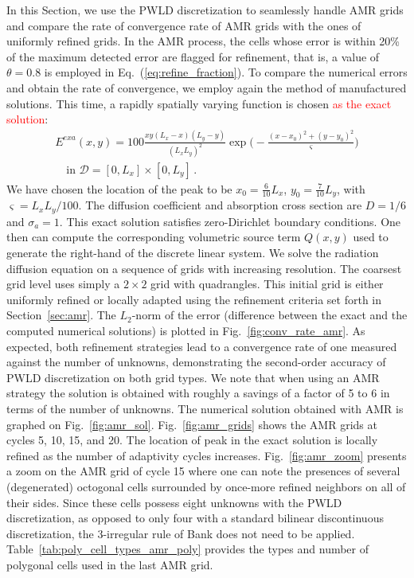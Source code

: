 \documentclass[preprint,10pt]{elsarticle}
\newcommand{\D}{\mathcal{D}}
\newcommand{\eqt}[1]{Eq.~(\ref{#1})}                     %
\newcommand{\fig}[1]{Fig.~\ref{#1}}                      %
\newcommand{\tbl}[1]{Table~\ref{#1}}                     %
\newcommand{\sct}[1]{Section~\ref{#1}}                   %
\newcommand{\tcr}[1]{\textcolor{red}{#1}}
\begin{document}
In this Section, we use the PWLD discretization to seamlessly handle AMR grids and compare the rate
of convergence rate of AMR grids with the ones of uniformly refined grids. In the AMR process, the cells whose
error is within 20\% of the maximum detected error are flagged for refinement, that is, a value of 
$\theta=0.8$ is employed in \eqt{eq:refine_fraction}.
To compare the numerical errors and obtain the rate of convergence, we employ again the method of 
manufactured solutions. This time, a rapidly spatially varying function is chosen
\tcr{as the exact solution}:
%
\begin{multline}
	E^{\textit{exa}}(x,y) = 100 \frac{xy(L_x-x)(L_y-y)}{(L_x L_y)^2}\exp\Big(-\frac{(x-x_0)^2+(y-y_0)^2}{\varsigma}\Big) \\
	 \quad \text{in } \D=[0,L_x]\times [0,L_y] \,.
\end{multline}
%
We have chosen the location of the peak to be $x_0=\tfrac{6}{10}L_x$, $y_0=\tfrac{7}{10}L_y$, with $\varsigma=L_xL_y/100$. 
The diffusion coefficient and absorption cross section are  $D=1/6$ and $\sigma_a=1$. 
This exact solution satisfies zero-Dirichlet boundary conditions. One then can compute 
the corresponding volumetric source term $Q(x,y)$ used to generate the right-hand of the discrete linear system. 
We solve the radiation diffusion equation on a sequence of grids with increasing resolution. The coarsest grid level
uses simply a $2\times 2$ grid with quadrangles. This initial grid is either uniformly refined or locally adapted 
using the refinement criteria set forth in \sct{sec:amr}. The $L_2$-norm of the error (difference
between the exact and the computed numerical solutions) is plotted in \fig{fig:conv_rate_amr}. As expected, both refinement
strategies lead to a convergence rate of one measured against the number of unknowns, demonstrating the 
second-order accuracy of PWLD discretization on both grid types. We note that when using an AMR strategy 
the solution is obtained with roughly a savings of
a factor of 5 to 6 in terms of the number of unknowns. 
The numerical solution obtained with AMR is graphed on \fig{fig:amr_sol}.
\fig{fig:amr_grids} shows the AMR grids at cycles 5, 10, 15, and 20. The location of peak in the exact solution is
locally refined as the number of adaptivity cycles increases. \fig{fig:amr_zoom} presents a zoom on the AMR grid of cycle 15
where one can note the presences of several (degenerated) octogonal cells surrounded by once-more refined neighbors on all 
of their sides. Since these cells possess eight unknowns with the PWLD discretization, as opposed to
only four with a standard bilinear discontinuous discretization, the 3-irregular rule of Bank does not need to be applied.
\tbl{tab:poly_cell_types_amr_poly} provides the types and number of polygonal cells used in the last AMR grid.
 
\end{document}
